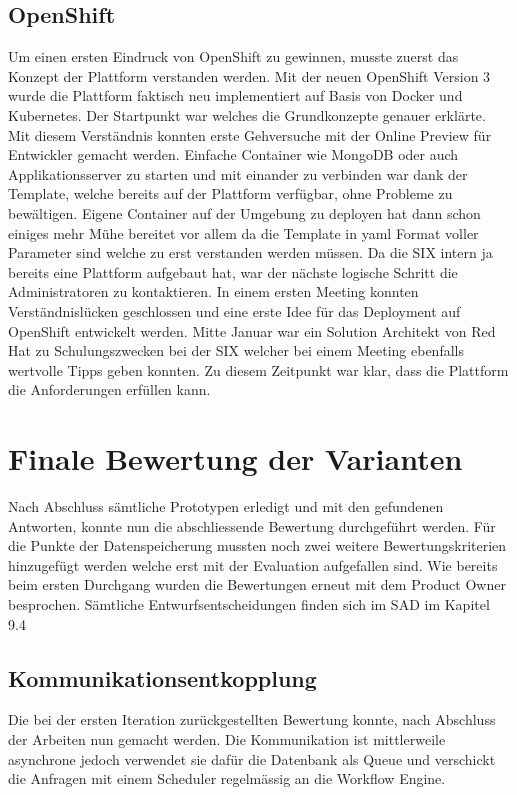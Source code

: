 \subsection{OpenShift}

Um einen ersten Eindruck von OpenShift zu gewinnen, musste zuerst das Konzept der Plattform verstanden werden. Mit der neuen OpenShift Version 3 wurde die Plattform faktisch neu implementiert auf Basis von Docker und Kubernetes. Der Startpunkt war \cite{openshiftintro} welches die Grundkonzepte genauer erklärte. Mit diesem Verständnis konnten erste Gehversuche mit der Online Preview für Entwickler gemacht werden. Einfache Container wie MongoDB oder auch Applikationsserver zu starten und mit einander zu verbinden war dank der Template, welche bereits auf der Plattform verfügbar, ohne Probleme zu bewältigen. Eigene Container auf der Umgebung zu deployen hat dann schon einiges mehr Mühe bereitet vor allem da die Template in yaml Format voller Parameter sind welche zu erst verstanden werden müssen. Da die SIX intern ja bereits eine Plattform aufgebaut hat, war der nächste logische Schritt die Administratoren zu kontaktieren. In einem ersten Meeting konnten Verständnislücken geschlossen und eine erste Idee für das Deployment auf OpenShift entwickelt werden. Mitte Januar war ein Solution Architekt von Red Hat zu Schulungszwecken bei der SIX welcher bei einem Meeting ebenfalls wertvolle Tipps geben konnten. Zu diesem Zeitpunkt war klar, dass die Plattform die Anforderungen erfüllen kann.
\newpage

\section{Finale Bewertung der Varianten}

Nach Abschluss sämtliche Prototypen erledigt und mit den gefundenen Antworten, konnte nun die abschliessende Bewertung durchgeführt werden. Für die Punkte der Datenspeicherung mussten noch zwei weitere Bewertungskriterien hinzugefügt werden welche erst mit der Evaluation aufgefallen sind. Wie bereits beim ersten Durchgang wurden die Bewertungen erneut mit dem Product Owner besprochen. Sämtliche Entwurfsentscheidungen finden sich im SAD im Kapitel 9.4

\subsection{Kommunikationsentkopplung}

Die bei der ersten Iteration zurückgestellten Bewertung konnte, nach Abschluss der Arbeiten nun gemacht werden. Die Kommunikation ist mittlerweile asynchrone jedoch verwendet sie dafür die Datenbank als Queue und verschickt die Anfragen mit einem Scheduler regelmässig an die Workflow Engine.


